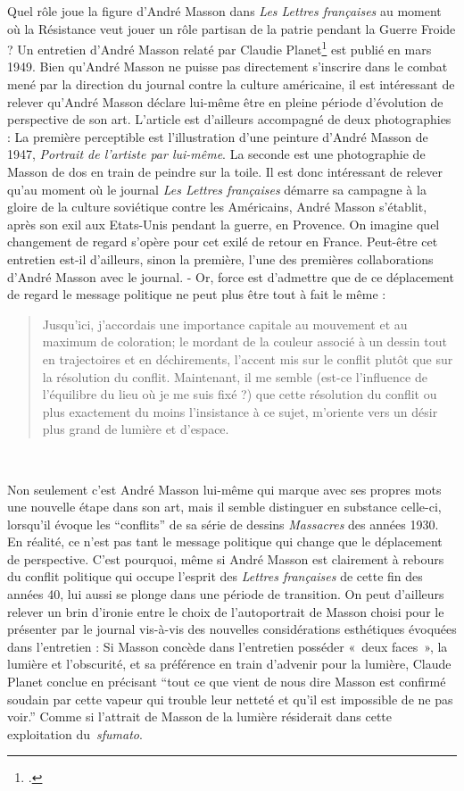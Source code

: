      Quel rôle joue la figure d’André Masson dans \emph{Les Lettres françaises} au moment où la Résistance veut jouer un rôle partisan de la patrie pendant la Guerre Froide ? Un entretien d’André Masson relaté par Claudie Planet\footcite{entretienmasson} est publié en mars 1949. Bien qu’André Masson ne puisse pas directement s’inscrire dans le combat mené par la direction du journal contre la culture américaine, il est intéressant de relever qu’André Masson déclare lui-même être en pleine période d’évolution de perspective de son art. L’article est d’ailleurs accompagné de deux photographies : La première perceptible est l’illustration d’une peinture d’André Masson de 1947, \emph{Portrait de l’artiste par lui-même}. La seconde est une photographie de Masson de dos en train de peindre sur la toile. Il est donc intéressant de relever qu’au moment où le journal \emph{Les Lettres françaises} démarre sa campagne à la gloire de la culture soviétique contre les Américains, André Masson s’établit, après son exil aux Etats-Unis pendant la guerre, en Provence. On imagine quel changement de regard s’opère pour cet exilé de retour en France. Peut-être cet entretien est-il d’ailleurs, sinon la première, l’une des premières collaborations d’André Masson avec le journal.
-
Or, force est d’admettre que de ce déplacement de regard le message politique ne peut plus être tout à fait le même : 
\begin{quote}
  Jusqu’ici, j’accordais une importance capitale au mouvement et au maximum de coloration; le mordant de la couleur associé à un dessin tout en trajectoires et en déchirements, l’accent mis sur le conflit plutôt que sur la résolution du conflit. Maintenant, il me semble (est-ce l’influence de l’équilibre du lieu où je me suis fixé ?) que cette résolution du conflit ou plus exactement du moins l’insistance à ce sujet, m’oriente vers un désir plus grand de lumière et d’espace.  
\end{quote}
 

	Non seulement c’est André Masson lui-même qui marque avec ses propres mots une nouvelle étape dans son art, mais il semble distinguer en substance celle-ci, lorsqu’il évoque les \enquote{conflits} de sa série de dessins \emph{Massacres} des années 1930. En réalité, ce n’est pas tant le message politique qui change que le déplacement de perspective. C’est pourquoi, même si André Masson est clairement à rebours du conflit politique qui occupe l’esprit des \emph{Lettres françaises} de cette fin des années 40, lui aussi se plonge dans une période de transition. On peut d’ailleurs relever un brin d’ironie entre le choix de l’autoportrait de Masson choisi pour le présenter par le journal vis-à-vis des nouvelles considérations esthétiques évoquées dans l’entretien : Si Masson concède dans l’entretien posséder « deux faces », la lumière et l’obscurité, et sa préférence en train d’advenir pour la lumière, Claude Planet conclue en précisant \enquote{tout ce que vient de nous dire Masson est confirmé soudain par cette vapeur qui trouble leur netteté et qu’il est impossible de ne pas voir.} Comme si l’attrait de Masson de la lumière résiderait dans cette exploitation du \emph{sfumato}. 


